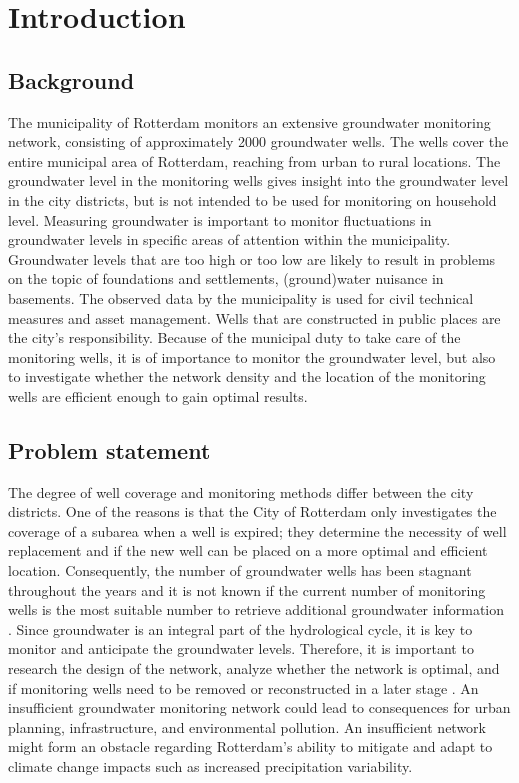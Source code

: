 \chapter{Introduction}
\label{chapter:introduction}


\section{Background}

The municipality of Rotterdam monitors an extensive groundwater monitoring network, consisting of approximately 2000 groundwater wells. The wells cover the entire municipal area of Rotterdam, reaching from urban to rural locations. The groundwater level in the monitoring wells gives insight into the groundwater level in the city districts, but is not intended to be used for monitoring on household level. Measuring groundwater is important to monitor fluctuations in groundwater levels in specific areas of attention within the municipality. Groundwater levels that are too high or too low are likely to result in problems on the topic of foundations and settlements, (ground)water nuisance in basements. The observed data by the municipality is used for civil technical measures and asset management. Wells that are constructed in public places are the city's responsibility. Because of the municipal duty to take care of the monitoring wells, it is of importance to monitor the groundwater level, but also to investigate whether the network density and the location of the monitoring wells are efficient enough to gain optimal results.


\section{Problem statement}

The degree of well coverage and monitoring methods differ between the city districts. One of the reasons is that the City of Rotterdam only investigates the coverage of a subarea when a well is expired; they determine the necessity of well replacement and if the new well can be placed on a more optimal and efficient location. Consequently, the number of groundwater wells has been stagnant throughout the years and it is not known if the current number of monitoring wells is the most suitable number to retrieve additional groundwater information \cite{geul-2022}. Since groundwater is an integral part of the hydrological cycle, it is key to monitor and anticipate the groundwater levels. Therefore, it is important to research the design of the network, analyze whether the network is optimal, and if monitoring wells need to be removed or reconstructed in a later stage \cite{european-environment-agency-2022}. An insufficient groundwater monitoring network could lead to consequences for urban planning, infrastructure, and environmental pollution. An insufficient network might form an obstacle regarding Rotterdam’s ability to mitigate and adapt to climate change impacts such as increased precipitation variability. 
\newpage
